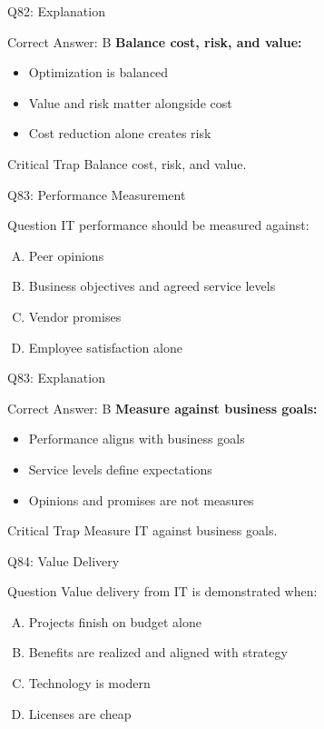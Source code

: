 \documentclass{beamer}
\begin{document}
	\begin{frame}{Q82: Explanation}
		\begin{block}{Correct Answer: B}
			\textbf{Balance cost, risk, and value:}
			\begin{itemize}
				\item Optimization is balanced
				\item Value and risk matter alongside cost
				\item Cost reduction alone creates risk
			\end{itemize}
		\end{block}
		\begin{alertblock}{Critical Trap}
			Balance cost, risk, and value.
		\end{alertblock}
	\end{frame}
	
	\begin{frame}{Q83: Performance Measurement}
		\begin{block}{Question}
			IT performance should be measured against:
		\end{block}
		\begin{enumerate}[(A)]
			\item Peer opinions
			\item Business objectives and agreed service levels
			\item Vendor promises
			\item Employee satisfaction alone
		\end{enumerate}
	\end{frame}
	
	\begin{frame}{Q83: Explanation}
		\begin{block}{Correct Answer: B}
			\textbf{Measure against business goals:}
			\begin{itemize}
				\item Performance aligns with business goals
				\item Service levels define expectations
				\item Opinions and promises are not measures
			\end{itemize}
		\end{block}
		\begin{alertblock}{Critical Trap}
			Measure IT against business goals.
		\end{alertblock}
	\end{frame}
	
	\begin{frame}{Q84: Value Delivery}
		\begin{block}{Question}
			Value delivery from IT is demonstrated when:
		\end{block}
		\begin{enumerate}[(A)]
			\item Projects finish on budget alone
			\item Benefits are realized and aligned with strategy
			\item Technology is modern
			\item Licenses are cheap
		\end{enumerate}
	\end{frame}
	
\end{document}
